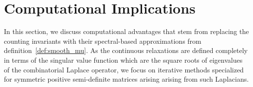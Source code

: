 \documentclass[12pt]{article}
\numberwithin{equation}{section}
\newcommand{\+}{%
	\raisebox{0.18ex}{\scaleobj{0.55}{+}}
}
\theoremstyle{definition}
\begin{document}
\section{Computational Implications}\label{sec:methodology}
In this section, we discuss computational advantages that stem from replacing the counting invariants with their spectral-based approximations from definition~\ref{def:smooth_mu}.
As the continuous relaxations are defined completely in terms of the singular value function which are the square roots of eigenvalues of the combinatorial Laplace operator, we focus on iterative methods specialized for symmetric positive semi-definite matrices arising arising from such Laplacians. 

\end{document}
